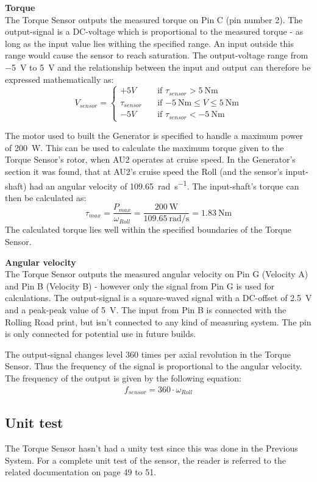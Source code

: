 \textbf{Torque}\\
The Torque Sensor outputs the measured torque on Pin C (pin number 2). The output-signal is a DC-voltage which is proportional to the measured torque - as long as the input value lies withing the specified range. An input outside this range would cause the sensor to reach saturation. The output-voltage range from \SI{-5}{\volt} to \SI{+5}{\volt} and the relationship between the input and output can therefore be expressed mathematically as:
\begin{equation}
	V_{sensor} = 
	\begin{cases}
		+5V				& \quad \text{if } \tau_{sensor} > \SI{+5}{\newton \meter}\\
		\tau_{sensor}   & \quad \text{if } \SI{-5}{\newton \meter} \leq V \leq \SI{+5}{\newton \meter}\\
		-5V				& \quad \text{if } \tau_{sensor} < \SI{-5}{\newton \meter}
	\end{cases}
\end{equation}

The motor used to built the Generator is specified to handle a maximum power of \SI{200}{\watt}\cite{Maxon}. This can be used to calculate the maximum torque given to the Torque Sensor's rotor, when AU2 operates at cruise speed. In the Generator's section it was found, that at AU2's cruise speed the Roll (and the sensor's input-shaft) had an angular velocity of \SI[per-mode=fraction]{109.65}{\radian \per \second}. The input-shaft's torque can then be calculated as:
\begin{equation}
	\tau_{max} = \frac{P_{max}}{\omega_{Roll}} = \frac{\SI{200}{\watt}}{\SI[per-mode=fraction]{109.65}{\radian \per \second}} = \SI{1.83}{\newton \meter}
\end{equation}
The calculated torque lies well within the specified boundaries of the Torque Sensor\cite{TorqueSensor}.

\textbf{Angular velocity}\\
The Torque Sensor outputs the measured angular velocity on Pin G (Velocity A) and Pin B (Velocity B) - however only the signal from Pin G is used for calculations. The output-signal is a square-waved signal with a DC-offset of \SI{2.5}{\volt} and a peak-peak value of \SI{5}{\volt}. The input from Pin B is connected with the Rolling Road print, but isn't connected to any kind of measuring system. The pin is only connected for potential use in future builds.

The output-signal changes level 360 times per axial revolution in the Torque Sensor. Thus the frequency of the signal is proportional to the angular velocity. The frequency of the output is given by the following equation:
\begin{equation}
	\begin{split}
		f_{sensor} = 360 \cdot \omega_{Roll}
	\end{split}
\end{equation}

\subsection{Unit test}
The Torque Sensor hasn't had a unity  test since this was done in the Previous System\cite{BAC_rullefelt}. For a complete unit test of the sensor, the reader is referred to the related documentation on page 49 to 51.